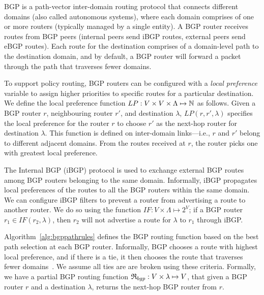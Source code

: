  BGP is a path-vector inter-domain routing protocol
that connects different domains (also called autonomous systems), where each domain
comprises of one or more routers (typically managed by a single
entity). A BGP router receives routes from BGP peers (internal peers
send iBGP routes, external peers send eBGP routes). Each route for the
destination comprises of a domain-level path to the destination
domain, and by default, a BGP router will forward a packet through the path that traverses fewer domains.
 
To support policy routing, BGP routers can be configured with a
\emph{local preference} variable to assign higher priorities to
specific routes for a particular destination. We define the local
preference function $LP: V \times V \times \Lambda \mapsto \mathbb{N}$ as
follows.  Given a BGP router $r$, neighbouring router $r'$, and  
destination $\lambda$, $LP(r, r', \lambda)$ specifies the local
preference for the router $r$ to choose $r'$ as the next-hop router for destination $\lambda$.  This function is defined
on inter-domain links---i.e., $r$ and $r'$ belong to different adjacent domains.  
From the routes received at $r$, the router
picks one with greatest local preference.

The Internal BGP (iBGP) protocol is used to 
exchange external BGP routes 
among BGP routers belonging
to the same domain. Informally, iBGP propagates local preferences of the routes to all the BGP routers within the same domain. 
We can configure iBGP 
filters to prevent a router from advertising 
a route to another router. We do so using the 
function $IF: V \times \Lambda \mapsto 2^V$;
if a BGP router $r_1 \in IF(r_2, \lambda)$, then
$r_2$ will not advertise a route for $\lambda$ to
$r_1$ through iBGP. 
 
Algorithm~\ref{alg:bgppathrules} defines the BGP routing function
based on the best path selection at each BGP router. 
Informally, BGP 
chooses a route with highest local preference, and
if there is a tie, it then chooses the route that traverses fewer domains~\cite{bgp}. 
We assume all ties are 
are broken using these criteria. 
Formally, we have a partial BGP routing function 
$\mathfrak{R}_{bgp}: V \times \lambda \mapsto V$, 
that given a BGP router $r$ and a destination $\lambda$,
returns the next-hop BGP router from $r$. 


